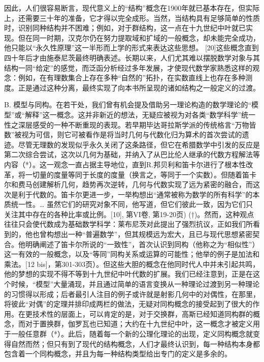 因此，人们很容易断言，现代意义上的“结构”概念在1900年就已基本存在，但实际上，还需要三十年的准备，它才得以完全成形。当然，当结构具有足够简单的性质时，识别同种结构并不困难；例如，对于群结构，这一点在十九世纪中叶就已实现。但在同一时期，汉克尔仍在努力提取域和扩域的一般概念，却未能完全成功，他只能以“永久性原理”这一半形而上学的形式来表达这些思想。 {[}20{]}这些概念直到四十年后才由施泰尼茨最终明确表述。长期以来，人们尤其难以摆脱数学对象与其结构一同“给定”的感觉，而泛函分析经过多年发展，才使现代数学家熟悉这样的观念：例如，在有理数集合上存在多种“自然的”拓扑，在实数直线上也存在多种测度。正是通过这种分离，最终实现了向本书所呈现的诸如结构之一般定义的过渡。

B. 模型与同构。在若干处，我们曾有机会提及借助另一理论构造的数学理论的“模型”或“解释”这一概念。这并非新近的想法，无疑应被视为对各类“数学科学”统一性之深层感受的一种不断重现的表现。若早期毕达哥拉斯学派的传统格言“万物皆数”被视为可信，则它可被看作是将当时几何与代数化归为算术的首次尝试的遗迹。尽管无理数的发现似乎永久关闭了这条路径，但它在希腊数学中引发的反应是第二次综合尝试，这次以几何为基础，并纳入了从巴比伦人继承的代数方程解法等内容（*）。这一观念一直占据主导地位，直到R.邦贝利和笛卡尔进行了根本性改革，将一切量的度量等同于长度的度量（换言之，等同于一个实数）。但随着笛卡尔和费马创建解析几何，趋势再次逆转，几何与代数实现了远为紧密的融合，而这次是利于代数的。笛卡尔更进一步，一举构想出“通常被称为数学的所有科学”的本质统一性。\ldots{} 虽然它们的研究对象不同，他写道，但它们彼此一致，因为它们只关注其中存在的各种比率或比例。{[}10{]}, 第VI卷, 第19-20页) (†)。然而，这种观点往往只会使代数成为基础数学科学：莱布尼茨对此提出了强烈抗议，正如我们所看到的，他也曾构想出一种“普遍数学”，但其规模远为宏大，且已与现代思想紧密契合。他明确阐述了笛卡尔所说的“一致性”，首次认识到同构（他称之为“相似性”）这一有效的一般概念，以及“等同”同构关系或运算的可能性；他举的例子是加法和乘法。{[}12 bis{]}，第301-303页）。但这些大胆的概念在他同时代人中并未引起共鸣，他的梦想的实现不得不等到十九世纪中叶代数的扩展。我们已经注意到，正是在这个时候，“模型”大量涌现，并且通过简单的语言变换从一种理论过渡到另一种理论的习惯得以形成；后者最引人注目的例子或许就是射影几何中的对偶性，在那里，将彼此“对偶”的定理并排印成两栏的做法，无疑对同构概念的接受起到了很大的作用。在更技术性的层面上，可以肯定的是，对于交换群，高斯已经知道同构群的概念，而对于置换群，伽罗瓦也已知道；大约在十九世纪中叶，这一概念才被定义用于一般任意群（*）。此后，随着每一个新的公理化理论的出现，定义同构概念就变得自然而然；但只有到了现代的结构概念，人们才最终认识到，每一种结构本身都包含着一个同构概念，并且为每一种结构类型给出专门的定义是多余的。

